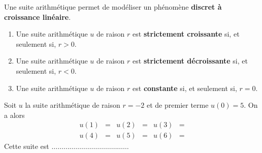 \documentclass[11pt]{article}
\begin{document}
\begin{rmq}
  Une suite arithmétique permet de modéliser un phénomène \textbf{discret à
  croissance linéaire}.
\end{rmq}

\begin{prop}
  \begin{enumerate}
    \item Une suite arithmétique $u$ de raison $r$ est \textbf{strictement
      croissante} si, et seulement si, $r>0$.
    \item Une suite arithmétique $u$ de raison $r$ est \textbf{strictement
      d\'ecroissante} si, et seulement si, $r<0$.
    \item Une suite arithmétique $u$ de raison $r$ est \textbf{constante} si, et
      seulement si, $r=0$.
  \end{enumerate}
\end{prop}

\begin{exemple}
  Soit $u$ la suite arithmétique de raison $r=-2$ et de premier terme $u(0)=5$. On
  a alors
  \begin{align*}
    u(1) &= &
    u(2) &= &
    u(3) &= \\
    u(4) &= &
    u(5) &= &
    u(6) &=
  \end{align*}
  Cette suite est $\ldots\ldots\ldots\ldots\ldots\ldots\ldots\ldots\ldots\ldots\ldots\ldots\ldots$
\end{exemple}
\end{document}
